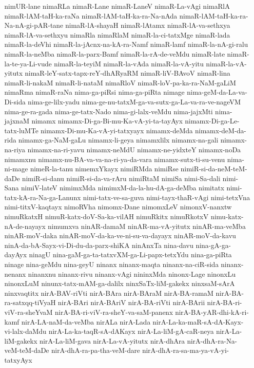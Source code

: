 {nimUR-lane
nimaRLa
nimaR-Lane
nimaR-LaneV
nimaR-La-vAgi
nimaRlA
nimaR-lAM-taH-ka-raNa
nimaR-lAM-taH-ka-ra-Na-nAda
nimaR-lAM-taH-ka-ra-Na-nA-gi-pAR-tane
nimaR-lA-shayaH
nimaR-lAtamx
nimaR-lA-va-sethxya
nimaR-lA-va-sethxyu
nimaRla
nimaRlaM
nimaR-la-ci-tatxMge
nimaR-lada
nimaR-la-deVhi
nimaR-la-jAcnx-na-kA-ra-Namf
nimaR-lamf
nimaR-la-nA-gi-ralu
nimaR-la-neMba
nimaR-la-parx-Bamf
nimaR-la-rA-de-veMdu
nimaR-late
nimaR-la-te-ya-Li-vude
nimaR-la-teyiM
nimaR-la-vAda
nimaR-la-vA-yitu
nimaR-la-vA-yitutx
nimaR-leY-satx-tapx-reY-dhARyaRM
nimaR-liV-BAvoV
nimaR-lina
nimaR-li-nakaM
nimaR-li-nataM
nimaRloV
nimaR-loV-pa-ka-ra-NaM-gaLiM
nimaRma
nimaR-raNa
nima-ga-piRsi
nima-ga-piRta
nimage
nima-geM-da-La-va-Di-sida
nima-ge-lilx-yadu
nima-ge-nu-tatxM-ga-va-sutx-ga-La-va-ra-ve-nageVM
nima-ge-ra-gada
nima-ge-tatx-Nado
nima-gi-lalx-veMdu
nima-jajxMti
nima-jajxnaM
nimamx
nimamx-Di-ga-Bi-mu-Ka-vA-yi-ta-tayAyx
nimamx-Di-ga-Le-tatx-luMTe
nimamx-Di-mu-Ka-vA-yi-tatxyayx
nimamx-deMda
nimamx-deM-da-rida
nimamx-ga-NaM-gaLu
nimamx-li-geya
nimamxlilx
nimamx-na-gali
nimamx-na-riya
nimamx-na-ri-yavu
nimamx-neMdU
nimamx-ne-yidxteY
nimamx-noDa
nimamxnu
nimamx-nu-BA-va-va-na-ri-ya-da-vara
nimamx-sutx-ti-su-venu
nima-ni-mage
nimeR-la-tanu
nimemxYkayx
nimiRMda
nimiRse
nimiR-si-da-neM-teM-daDe
nimiR-si-danu
nimiR-si-da-va-rAru
nimiRtaM
nimiSa
nimi-Sa-dali
nimi-Sana
nimiV-lateV
nimimxMda
nimimxM-da-la-hu-dA-ga-deMba
nimitatx
nimi-tatx-kA-ra-Na-ga-Lanunx
nimi-tatx-ve-sa-guva
nimi-tayx-thaR-vAgi
nimi-tetxVna
nimi-titxV-kaqtayx
nimoRVha
nimomx-Dane
nimomxLeV
nimonxV-nanxtw
nimuRkatxH
nimuR-katx-doV-Sa-ka-vilAH
nimuRkitx
nimuRkotxV
nimu-katx-nA-de-nayayx
nimumxva
ninAR-damaM
ninAR-ma-vA-yitutx
ninAR-ma-veMba
ninAR-moV-daka
ninAR-moV-da-ka-ve-ni-su-va-dayayx
ninAR-moV-da-kavu
ninA-da-bA-Sayx-vi-Di-du-da-parx-shiKA
ninAnxTa
nina-davu
nina-gA-ga-dayAyx
ninagU
nina-gaM-ga-ta-tatxvXM-ga-Li-papx-tetxYdu
nina-ga-piRta
ninage
nina-geMdu
nina-geyU
ninanx
ninanx-maqta
ninanx-na-ciR-sida
ninanx-nenanx
ninanxnu
ninanx-rivu
ninanx-vAgi
nininxMda
ninonx-Lage
ninonxLu
ninonxLuM
ninunx-tatx-mAM-ga-dalilx
ninxSaTx-liM-gakekx
ninxsaM-sArA
ninxvaqtitx
nirA-BAV-riVti
nirA-BAra
nirA-BAraM
nirA-BA-ramaM
nirA-BA-ra-satxqq-tiVyaH
nirA-BAri
nirA-BAriV
nirA-BA-riVti
nirA-BArii
nirA-BA-ri-viV-ra-sheYvaM
nirA-BA-ri-viV-ra-sheY-va-saM-panenx
nirA-BA-yAR-dhi-kA-ri-kamf
nirA-LA-naM-da-veMba
nirALa
nirA-Lada
nirA-La-ka-maR-sA-dA-Kayx-vi-lalx-daMdu
nirA-La-ka-taqR-sA-dAKayx
nirA-La-liM-gA-caR-neya
nirA-La-liM-gakekx
nirA-La-liM-gava
nirA-La-vA-yitutx
nirA-dhAra
nirA-dhA-ra-Na-veM-teM-daDe
nirA-dhA-ra-pa-tha-veM-dare
nirA-dhA-ra-sa-ma-ya-vA-yi-tatxyAyx
}
